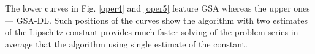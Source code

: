 \documentclass[runningheads]{llncs}
\begin{document}
The lower curves in Fig. \ref{oper4} and \ref{oper5} feature GSA whereas the upper ones --- GSA-DL. Such positions of the curves show the algorithm with two estimates of the Lipschitz constant provides much faster solving of the problem series in average that the algorithm using single estimate of the constant.

%




\end{document}
